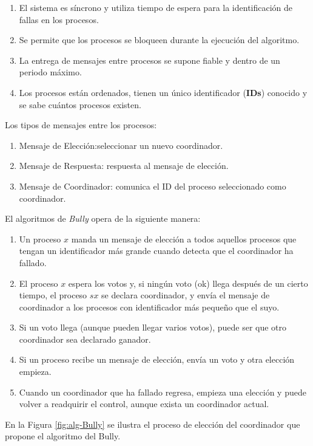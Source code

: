 {	\begin{enumerate}				
		\item  El sistema es síncrono y utiliza tiempo de espera para la identificación de fallas en los procesos.
		\item Se permite que los procesos se bloqueen durante la ejecución del algoritmo.
		\item La entrega de mensajes entre procesos se supone fiable y dentro de un periodo máximo.
		\item Los procesos están ordenados, tienen un único identificador (\textbf{IDs}) conocido y se sabe cuántos procesos existen.
	\end{enumerate}			 

Los tipos de mensajes entre los procesos:
	\begin{enumerate}
		\item Mensaje de Elección:seleccionar un nuevo coordinador.
		\item Mensaje de Respuesta: respuesta al mensaje de elección.
		\item Mensaje de Coordinador: comunica el ID del proceso seleccionado como coordinador.
	\end{enumerate}	
 
El algoritmos de \textit{Bully} opera de la siguiente manera:
 
	\begin{enumerate}				
		\item  Un proceso $x$ manda un mensaje de elección a todos aquellos procesos que tengan un identificador más grande cuando detecta que el coordinador ha fallado.
		\item El proceso $x$ espera los votos y, si ningún voto (ok) llega después de un cierto tiempo, el proceso $sx$ se declara coordinador, y envía el mensaje de coordinador a los procesos con identificador más pequeño que el suyo.
		\item Si un voto llega (aunque pueden llegar varios votos), puede ser que otro coordinador sea declarado ganador.
		\item  Si un proceso recibe un mensaje de elección, envía un voto y otra elección empieza.
		\item Cuando un coordinador que ha fallado regresa, empieza una elección y puede volver a readquirir el control, aunque exista un coordinador actual.
	\end{enumerate}			 
 
  En la Figura \ref{fig:alg-Bully} se ilustra el proceso de elecci\'on del coordinador que propone el algoritmo del Bully.
 
}
